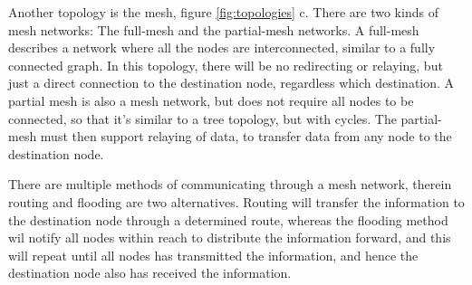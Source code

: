 Another topology is the mesh, figure \ref{fig:topologies} c. There are two kinds of mesh networks: The full-mesh and the partial-mesh networks. A full-mesh describes a network where all the nodes are interconnected, similar to a fully connected graph. In this topology, there will be no redirecting or relaying, but just a direct connection to the destination node, regardless which destination. A partial mesh is also a mesh network, but does not require all nodes to be connected, so that it's similar to a tree topology, but with cycles. The partial-mesh must then support relaying of data, to transfer data from any node to the destination node.



There are multiple methods of communicating through a mesh network, therein routing and flooding are two alternatives. Routing will transfer the information to the destination node through a determined route, whereas the flooding method wil notify all nodes within reach to distribute the information forward, and this will repeat until all nodes has transmitted the information, and hence the destination node also has received the information.

